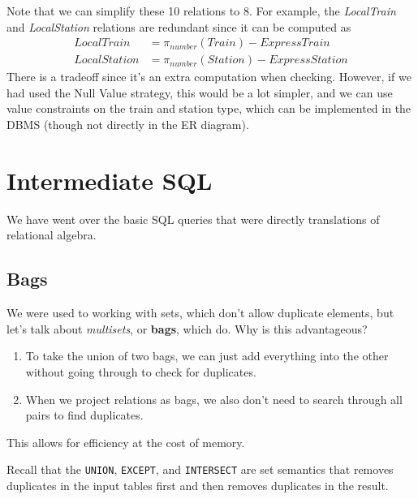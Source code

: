 \documentclass{article}
\begin{document}
\begin{example}
\begin{enumerate}
      \end{enumerate}
      Note that we can simplify these 10 relations to 8. For example, the \textit{LocalTrain} and \textit{LocalStation} relations are redundant since it can be computed as 
      \begin{align}
        LocalTrain & = \pi_{number} (Train) - ExpressTrain \\
        LocalStation & = \pi_{number} (Station) - ExpressStation
      \end{align}
      There is a tradeoff since it's an extra computation when checking. However, if we had used the Null Value strategy, this would be a lot simpler, and we can use value constraints on the train and station type, which can be implemented in the DBMS (though not directly in the ER diagram). 
    \end{example}

\section{Intermediate SQL} 

    We have went over the basic SQL queries that were directly translations of relational algebra. 

  \subsection{Bags}

    We were used to working with sets, which don't allow duplicate elements, but let's talk about \textit{multisets}, or \textbf{bags}, which do. Why is this advantageous? 
    \begin{enumerate}
      \item To take the union of two bags, we can just add everything into the other without going through to check for duplicates. 
      \item When we project relations as bags, we also don't need to search through all pairs to find duplicates. 
    \end{enumerate}
    This allows for efficiency at the cost of memory. 

    Recall that the \texttt{UNION}, \texttt{EXCEPT}, and \texttt{INTERSECT} are set semantics that removes duplicates in the input tables first and then removes duplicates in the result. 
\end{document}
